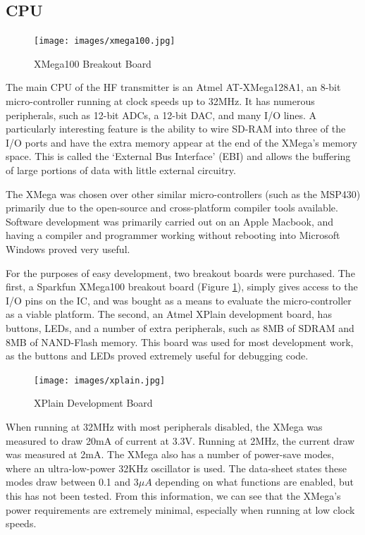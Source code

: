 \documentclass[a4paper,12pt]{article}
\begin{document}
\subsection{CPU}
\begin{figure}
  \begin{center}
    \texttt{[image: images/xmega100.jpg]}
  \end{center}
  \caption{XMega100 Breakout Board}
  \label{fig:xmega100}
\end{figure}
The main CPU of the HF transmitter is an Atmel AT-XMega128A1, an 8-bit micro-controller running at clock speeds up to 32MHz. It has numerous peripherals, such as 12-bit ADCs, a 12-bit DAC, and many I/O lines. A particularly interesting feature is the ability to wire SD-RAM into three of the I/O ports and have the extra memory appear at the end of the XMega's memory space. This is called the `External Bus Interface' (EBI) and allows the buffering of large portions of data with little external circuitry.

The XMega was chosen over other similar micro-controllers (such as the MSP430) primarily due to the open-source and cross-platform compiler tools available. Software development was primarily carried out on an Apple Macbook, and having a compiler and programmer working without rebooting into Microsoft Windows proved very useful.

For the purposes of easy development, two breakout boards were purchased. The first, a Sparkfun XMega100 breakout board (Figure \ref{fig:xmega100}), simply gives access to the I/O pins on the IC, and was bought as a means to evaluate the micro-controller as a viable platform. The second, an Atmel XPlain development board, has buttons, LEDs, and a number of extra peripherals, such as 8MB of SDRAM and 8MB of NAND-Flash memory. This board was used for most development work, as the buttons and LEDs proved extremely useful for debugging code.

\begin{figure}
  \begin{center}
    \texttt{[image: images/xplain.jpg]}
  \end{center}
  \caption{XPlain Development Board}
  \label{fig:xplain}
\end{figure}

When running at 32MHz with most peripherals disabled, the XMega was measured to draw 20mA of current at 3.3V. Running at 2MHz, the current draw was measured at 2mA. The XMega also has a number of power-save modes, where an ultra-low-power 32KHz oscillator is used. The data-sheet states these modes draw between 0.1 and $3\mu A$ depending on what functions are enabled, but this has not been tested. From this information, we can see that the XMega's power requirements are extremely minimal, especially when running at low clock speeds.
\end{document}
